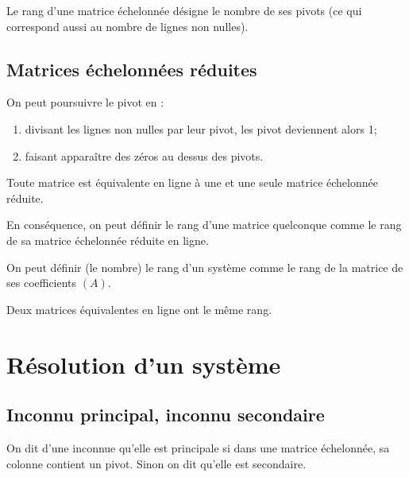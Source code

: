\documentclass[10pt]{article}
\begin{document}
\begin{defi}
Le rang d'une matrice échelonnée désigne le nombre de ses pivots (ce qui correspond aussi au nombre de lignes non nulles). 
\end{defi}

\subsection{Matrices échelonnées réduites}
On peut poursuivre le pivot en : 
\begin{enumerate}
\item divisant les lignes non nulles par leur pivot, les pivot deviennent alors 1;
\item faisant apparaître des zéros au dessus des pivots. 
\end{enumerate}

\begin{prop}
Toute matrice est équivalente en ligne à une et une seule matrice échelonnée réduite. 

En conséquence, on peut définir le rang d'une matrice quelconque comme le rang de sa matrice échelonnée réduite en ligne. 

On peut définir (le nombre) le rang d'un système comme le rang de la matrice de ses coefficients $(A)$. 
\end{prop}

\begin{rem}
Deux matrices équivalentes en ligne ont le même rang. 
\end{rem}

\section{Résolution d'un système}
\subsection{Inconnu principal, inconnu secondaire}
\begin{defi}
On dit d'une inconnue qu'elle est principale si dans une matrice échelonnée, sa colonne contient un pivot. Sinon on dit qu'elle est secondaire.
\end{defi}

\begin{exemple}

\end{exemple}



\begin{thebibliography}{2}
\end{thebibliography}
\end{document}
